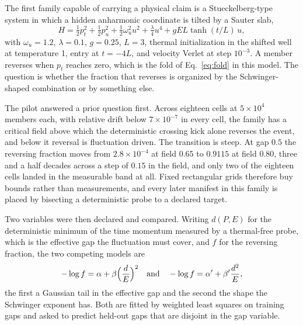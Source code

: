 \documentclass[aps,pre,reprint,nofootinbib,floatfix]{revtex4-2}
\begin{document}
The first family capable of carrying a physical claim is a
Stueckelberg-type system in which a hidden anharmonic coordinate is
tilted by a Sauter slab,
\begin{equation}
  H = \tfrac12 p_t^2 + \tfrac12 p_u^2
    + \tfrac12 \omega_u^2 u^2 + \tfrac{\lambda}{4} u^4
    + g E L \tanh(t/L)\, u ,
  \label{eq:sauter}
\end{equation}
with $\omega_u = 1.2$, $\lambda = 0.1$, $g = 0.25$, $L = 3$, thermal
initialization in the shifted well at temperature 1, entry at
$t = -4L$, and velocity Verlet at step $10^{-3}$.  A member reverses
when $p_t$ reaches zero, which is the fold of Eq.~\eqref{eq:fold} in
this model.  The question is whether the fraction that reverses is
organized by the Schwinger-shaped combination or by something else.

The pilot answered a prior question first.  Across eighteen cells at
$5 \times 10^4$ members each, with relative drift below
$7 \times 10^{-7}$ in every cell, the family has a critical field above which the
deterministic crossing kick alone reverses the event, and below it
reversal is fluctuation driven.  The transition is steep.  At gap
$0.5$ the reversing fraction moves from $2.8 \times 10^{-4}$ at field
$0.65$ to $0.9115$ at field $0.80$, three and a half decades across a
step of $0.15$ in the field, and only two of the eighteen cells landed
in the measurable band at all.  Fixed rectangular grids therefore buy
bounds rather than measurements, and every later manifest in this
family is placed by bisecting a deterministic probe to a declared
target.

Two variables were then declared and compared.  Writing $d(P, E)$ for
the deterministic minimum of the time momentum measured by a
thermal-free probe, which is the effective gap the fluctuation must
cover, and $f$ for the reversing fraction, the two competing models are
\begin{equation}
  -\log f = \alpha + \beta \Bigl(\frac{d}{E}\Bigr)^{2}
  \quad\text{and}\quad
  -\log f = \alpha' + \beta' \frac{d^{2}}{E},
  \label{eq:axes}
\end{equation}
the first a Gaussian tail in the effective gap and the second the shape
the Schwinger exponent has.  Both are fitted by weighted least squares
on training gaps and asked to predict held-out gaps that are disjoint
in the gap variable.
\end{document}
